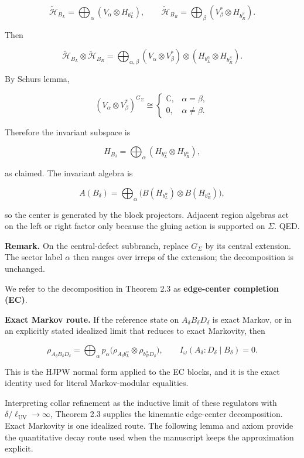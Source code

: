 \[
\tilde{\mathcal H}_{B_L} = \bigoplus_\alpha (V_\alpha \otimes H_{b_L^\alpha}),\qquad
\tilde{\mathcal H}_{B_R} = \bigoplus_\beta (V_\beta^* \otimes H_{b_R^\beta}).
\]

Then

\[
\tilde{\mathcal H}_{B_L} \otimes \tilde{\mathcal H}_{B_R}
= \bigoplus_{\alpha,\beta}
(V_\alpha \otimes V_\beta^*) \otimes
(H_{b_L^\alpha} \otimes H_{b_R^\beta}).
\]

By Schur\textquotesingle s lemma,

\[
(V_\alpha \otimes V_\beta^*)^{G_\Sigma}
\cong
\begin{cases}
\mathbb C, & \alpha=\beta,\\
0, & \alpha\ne\beta.
\end{cases}
\]

Therefore the invariant subspace is

\[
H_{B_\delta} = \bigoplus_\alpha (H_{b_L^\alpha} \otimes H_{b_R^\alpha}),
\]

as claimed. The invariant algebra is

\[
A(B_\delta) = \bigoplus_\alpha
\bigl(B(H_{b_L^\alpha}) \otimes B(H_{b_R^\alpha})\bigr),
\]

so the center is generated by the block projectors. Adjacent region algebras act on the left or right factor only because the gluing action is supported on \(\Sigma\). QED.

\textbf{Remark.} On the central-defect subbranch, replace \(G_\Sigma\) by its central extension. The sector label \(\alpha\) then ranges over irreps of the extension; the decomposition is unchanged.

We refer to the decomposition in Theorem 2.3 as \textbf{edge-center completion (EC)}.

\textbf{Exact Markov route.} If the reference state on \(A_\delta B_\delta D_\delta\) is exact Markov, or in an explicitly stated idealized limit that reduces to exact Markovity, then

\[
\rho_{A_\delta B_\delta D_\delta}
= \bigoplus_\alpha p_\alpha
\bigl(\rho_{A_\delta b_L^\alpha} \otimes \rho_{b_R^\alpha D_\delta}\bigr),
\qquad
I_\omega(A_\delta:D_\delta \mid B_\delta)=0.
\]

This is the HJPW normal form applied to the EC blocks, and it is the exact identity used for
literal Markov-modular equalities.

Interpreting collar refinement as the inductive limit of these regulators with \(\delta/\ell_{\mathrm{UV}} \to \infty\), Theorem 2.3 supplies the kinematic edge-center decomposition. Exact Markovity is one idealized route. The following lemma and axiom provide the quantitative decay route used when the manuscript keeps the approximation explicit.

